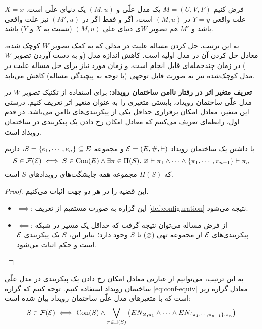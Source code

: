 \begin{theorem}\label{thm:causality-w-projection}
  فرض کنیم
  $M=(U,V,F)$
  یک مدل علّی و
  $(M,u)$
  یک دنیای علّی است.
  $X=x$
  علت واقعی
  $Y=y$
  در
  $(M,u)$
  است، اگر و فقط اگر در
  $(M',u)$
  نیز علت واقعی باشد و
  $M'$
  هم
  تصویر $W$ی
  دنیای علی
  $(M,u)$
  (نسبت به
  $X$ و $Y$)
  باشد.
\end{theorem}

به این ترتیب، حل کردن مساله علیت در مدلی که
به کمک
تصویر $W$
کوچک شده، معادل حل کردن آن در مدل اولیه است.
کاهش اندازه مدل
(و به دست آوردن تصویر $W$)
در زمان چندجمله‌ای قابل انجام است،
و زمان مورد نیاز برای حل مساله علیت در مدل کوچک‌شده
نیز به صورت  قابل توجهی
(با توجه به پیچیدگی مساله)
کاهش می‌یابد.

\textbf{تعریف متغیر اثر در رفتار ناامن ساختمان رویداد:}
برای استفاده از تکنیک
تصویر $W$
در مدل علّی ساختمان رویداد،
بایستی متغیری را به عنوان متغیر اثر تعریف کنیم.
درستی این متغیر، معادل
امکان برقراری حداقل یکی از پیکربندی‌های ناامن می‌باشد.
در قدم اول، رابطه‌ای تعریف می‌کنیم که معادل
امکان رخ دادن یک پیکربندی در ساختمان رویداد است.

\begin{theorem}\label{th:conf-equiv}
  با داشتن یک ساختمان رویداد
  $\mathcal{E}=(E,\#,\vdash)$
  و مجموعه
  $S = \left\{ e_1,\cdots,e_n \right\} \subseteq E$،
  داریم
  \begin{equation}\label{eq:conf-equiv}
    S \in \operatorname{\mathcal{F}}(\mathcal{E}) \iff
    S \in \operatorname{Con}(E)
    \wedge \exists \pi \in \Pi(S).\;
    \varnothing \vdash \pi_1 \wedge \cdots \wedge
    \left\{ \pi_1,\cdots,\pi_{n-1} \right\} \vdash \pi_n
  \end{equation}
  که
  $\Pi(S)$
  مجموعه همه جایشگت‌های رویدادهای
  $S$
  است.
\end{theorem}

\begin{proof}
  این قضیه را در هر دو جهت اثبات می‌کنیم.
  \begin{itemize}
    \item $\implies$:
    این گزاره به صورت مستقیم از تعریف
    \ref{def:configuration}
    نتیجه می‌شود.
    \item $\impliedby$:
    از فرض مساله می‌توان نتیجه گرفت که حداقل
    یک مسیر در شبکه پیکربندی‌های
    $\mathcal{E}$
    از مجموعه تهی
    ($\varnothing$)
    تا $S$
    وجود دارد؛ بنابر این،
    $S$
    یک پیکربندی
    $\mathcal{E}$
    است و حکم اثبات می‌شود.
  \end{itemize}
\end{proof}

به این ترتیب، می‌توانیم از عبارتی معادل
امکان رخ دادن یک پیکربندی در مدل علّی ساختمان رویداد
استفاده کنیم. توجه کنیم که گزاره
\ref{eq:conf-equiv}
معادل گزاره زیر است که با متغیرهای مدل علّی
ساختمان رویداد بیان شده است:
\begin{equation}\label{eq:conf-equiv-cm}
  S \in \operatorname{\mathcal{F}}(\mathcal{E}) \iff
  \operatorname{Con}(S) \wedge
  \bigvee_{\pi \in \Pi(S)} \left(
    EN_{\varnothing, \pi_1} \wedge \cdots \wedge
    EN_{\left\{ \pi_1,\cdots,\pi_{n-1} \right\}, \pi_n}
  \right)
\end{equation}

